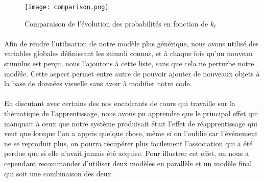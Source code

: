 \begin{figure}[H]
  \caption{Comparaison de l'évolution des probabilités en fonction de $k_t$}
  \texttt{[image: comparison.png]}
\end{figure}

\paragraph{}
Afin de rendre l'utilisation de notre modèle plus générique, nous avons utilisé
des variables globales définissant les stimuli connus, et à chaque fois qu'un
nouveau stimulus est perçu, nous l'ajoutons à cette liste, sans que cela ne
perturbe notre modèle. Cette aspect permet entre autre de pouvoir ajouter de
nouveaux objets à la base de données visuelle sans avoir à modifier notre code.

\paragraph{}
En discutant avec certains des nos encadrants de cours qui travaille sur la
thématique de l'apprentissage, nous avons pu apprendre que le principal effet
qui manquait à ceux que notre système produisait était l'effet de
réapprentissage qui veut que lorsque l'on a appris quelque chose, même si on
l'oublie car l'événement ne se reproduit plus, on pourra récupérer plus facilement
l'association qui a été perdue que si elle n'avait jamais été acquise. Pour
illustrer cet effet, on nous a cependant recommander d'utiliser deux modèles en
parallèle et un modèle final qui soit une combinaison des deux.
